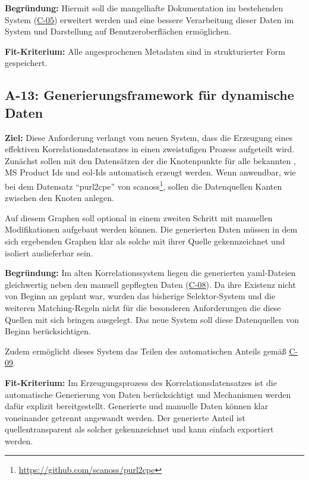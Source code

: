 \textbf{Begründung:}
Hiermit soll die mangelhafte Dokumentation im bestehenden System (\hyperref[subsec:c-05-reason-not-good-enough]{C-05}) erweitert werden und eine bessere Verarbeitung dieser Daten im System und Darstellung auf Benutzeroberflächen ermöglichen.

\textbf{Fit-Kriterium:}
Alle angesprochenen Metadaten sind in strukturierter Form gespeichert.

\subsection{A-13: Generierungsframework für dynamische Daten}\label{subsec:req-generated-data}

\textbf{Ziel:}
Diese Anforderung verlangt vom neuen System, dass die Erzeugung eines effektiven Korrelationsdatensatzes in einen zweistufigen Prozess aufgeteilt wird.
Zunächst sollen mit den Datensätzen der \metaeffektsp die Knotenpunkte für alle bekannten , MS Product Ids und \acrshort{eol}-Ids automatisch erzeugt werden.
Wenn anwendbar, wie bei dem Datensatz \enquote{purl2cpe} von scanoss\footnote{\url{https://github.com/scanoss/purl2cpe}}, sollen die Datenquellen Kanten zwischen den Knoten anlegen.

Auf diesem Graphen soll optional in einem zweiten Schritt mit manuellen Modifikationen aufgebaut werden können.
Die generierten Daten müssen in dem sich ergebenden Graphen klar als solche mit ihrer Quelle gekennzeichnet und isoliert auslieferbar sein.

\textbf{Begründung:}
Im alten Korrelationssystem liegen die generierten \acrshort{yaml}-Dateien gleichwertig neben den manuell gepflegten Daten (\hyperref[subsec:c-08-generated-correlation-data]{C-08}).
Da ihre Existenz nicht von Beginn an geplant war, wurden das bisherige Selektor-System und die weiteren Matching-Regeln nicht für die besonderen Anforderungen die diese Quellen mit sich bringen ausgelegt.
Das neue System soll diese Datenquellen von Beginn berücksichtigen.

Zudem ermöglicht dieses System das Teilen des automatischen Anteils gemäß \hyperref[subsec:c-09-sharing-of-public-data]{C-09}.

\textbf{Fit-Kriterium:}
Im Erzeugungsprozess des Korrelationsdatensatzes ist die automatische Generierung von Daten berücksichtigt und Mechanismen werden dafür explizit bereitgestellt.
Generierte und manuelle Daten können klar voneinander getrennt angewandt werden.
Der generierte Anteil ist quellentransparent als solcher gekennzeichnet und kann einfach exportiert werden.


